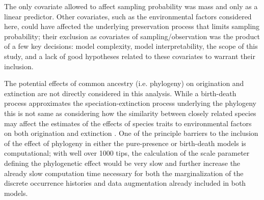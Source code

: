 \documentclass[12pt,letterpaper]{article}
\begin{document}
The only covariate allowed to affect sampling probability was mass and only as a linear predictor. Other covariates, such as the environmental factors considered here, could have affected the underlying preservation process that limits sampling probability; their exclusion as covariates of sampling/observation was the product of a few key decisions: model complexity, model interpretability, the scope of this study, and a lack of good hypotheses related to these covariates to warrant their inclusion. %


The potential effects of common ancestry (i.e. phylogeny) on origination and extinction are not directly considered in this analysis. While a birth-death process approximates the speciation-extinction process underlying the phylogeny \citep{Silvestro2014a} this is not same as considering how the similarity between closely related species may affect the estimates of the effects of species traits to environmental factors on both origination and extinction \citep{Smits2015b,Harnik2014}. One of the principle barriers to the inclusion of the effect of phylogeny in either the pure-presence or birth-death models is computational; with well over 1000 tips, the calculation of the scale parameter defining the phylogenetic effect would be very slow and further increase the already slow computation time necessary for both the marginalization of the discrete occurrence histories and data augmentation already included in both models.
\end{document}
